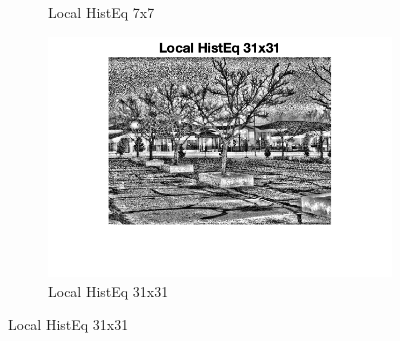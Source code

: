 \documentclass[12pt]{article}
\begin{document}
\begin{figure}[h!]
\begin{subfigure}[b]{0.3\textwidth}
            \caption{Local HistEq 7x7}
        \end{subfigure}
        \hfill
        \begin{subfigure}[b]{0.3\textwidth}
            \centering
            \includegraphics[width=\textwidth]{../images/LC1_localHistEq_31x31.png}
            \caption{Local HistEq 31x31}
        \end{subfigure}
        
        \vspace{10pt} %
        

\end{figure}
\end{document}
